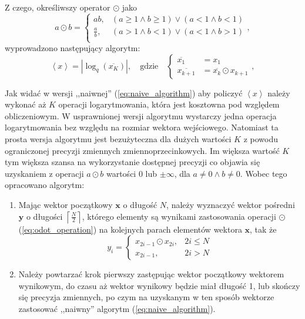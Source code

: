 \documentclass[pl,12pt]{aghdpl}
\begin{document}
Z czego, określiwszy operator $\odot$ jako
\begin{equation}\label{eq:odot_operation}
  a \odot b = \begin{cases}
    ab, & (a \geq 1 \land b \geq 1) \lor (a < 1 \land b < 1)\\
    \frac{a}{b}, & (a > 1 \land b < 1) \lor (a < 1 \land b > 1)\\
  \end{cases},
\end{equation}
wyprowadzono następujący algorytm:
\begin{equation}
  \left<x\right> = |\log_q(\overline{x_K})|, \quad\text{gdzie}\quad
  \begin{cases}
    \overline{x_1} &= x_1\\
    \overline{x_{k+1}} &= \overline{x_k}\odot x_{k+1}
  \end{cases},
\end{equation}

Jak widać w wersji ,,naiwnej'' (\ref{eq:naive_algorithm}) aby policzyć
$\left<x\right>$ należy wykonać aż $K$ operacji logarytmowania, która jest
kosztowna pod względem obliczeniowym. W usprawnionej wersji algorytmu wystarczy
jedna operacja logarytmowania bez względu na rozmiar wektora wejściowego.
Natomiast ta prosta wersja algorytmu jest bezużyteczna dla dużych wartości $K$
z powodu ograniczonej precyzji zmiennych zmiennoprzecinkowych. Im większa
wartość $K$ tym większa szansa na wykorzystanie dostępnej precyzji co objawia
się uzyskaniem z operacji $a \odot b$ wartości $0$ lub $\pm\infty$, dla
$a \neq 0 \land b \neq 0$. Wobec tego opracowano algorytm:
\begin{enumerate}
  \item Mając wektor początkowy $\bm x$ o długość $N$, należy wyznaczyć wektor
    pośredni $\bm y$ o długości
    $\left\lceil\frac{N}{2}\right\rceil$, którego elementy są wynikami
    zastosowania operacji $\odot$ (\ref{eq:odot_operation}) na kolejnych parach
    elementów wektora $\bm x$, tak że \begin{equation}
      y_i = \begin{cases}
        x_{2i-1}\odot x_{2i}, & 2i \leq N\\
        x_{2i-1}, & 2i > N
      \end{cases}
    \end{equation}
  \item Należy powtarzać krok pierwszy zastępując wektor początkowy wektorem
    wynikowym, do czasu aż wektor wynikowy będzie miał długość 1, lub skończy
    się precyzja zmiennych, po czym na uzyskanym w ten sposób wektorze
    zastosować ,,naiwny'' algorytm (\ref{eq:naive_algorithm}).
\end{enumerate}
\end{document}
